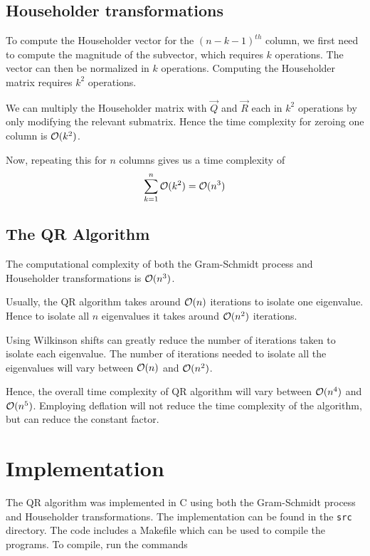 \documentclass{article}
\begin{document}
\subsection{Householder transformations}

To compute the Householder vector for the $(n - k - 1)^{th}$ column, we first need to
compute the magnitude of the subvector, which requires $k$ operations. The vector
can then be normalized in $k$ operations. Computing the Householder matrix requires
$k^2$ operations.

We can multiply the Householder matrix with $\vec{Q}$ and $\vec{R}$ each in $k^2$
operations by only modifying the relevant submatrix. Hence the time complexity for
zeroing one column is $\mathcal{O}(k^2)$.

Now, repeating this for $n$ columns gives us a time complexity of
\begin{align}
    \sum_{k=1}^n \mathcal{O}(k^2) = \mathcal{O}(n^3)
\end{align}

\subsection{The QR Algorithm}

The computational complexity of both the Gram-Schmidt process and Householder transformations
is $\mathcal{O}(n^3)$.

Usually, the QR algorithm takes around $\mathcal{O}(n)$ iterations to isolate one eigenvalue.
Hence to isolate all $n$ eigenvalues it takes around $\mathcal{O}(n^2)$ iterations. 

Using Wilkinson shifts can greatly reduce the number of iterations taken to isolate each
eigenvalue. The number of iterations needed to isolate all the eigenvalues will vary between
$\mathcal{O}(n)$ and $\mathcal{O}(n^2)$. 

Hence, the overall time complexity of QR algorithm will vary between $\mathcal{O}(n^4)$ and $\mathcal{O}(n^5)$.
Employing deflation will not reduce the time complexity of the algorithm, but can reduce the
constant factor.


\section{Implementation}

The QR algorithm was implemented in C using both the Gram-Schmidt process and 
Householder transformations. The implementation can be found in the \texttt{src} directory.
The code includes a Makefile which can be used to compile the programs. To compile,
run the commands
\end{document}

